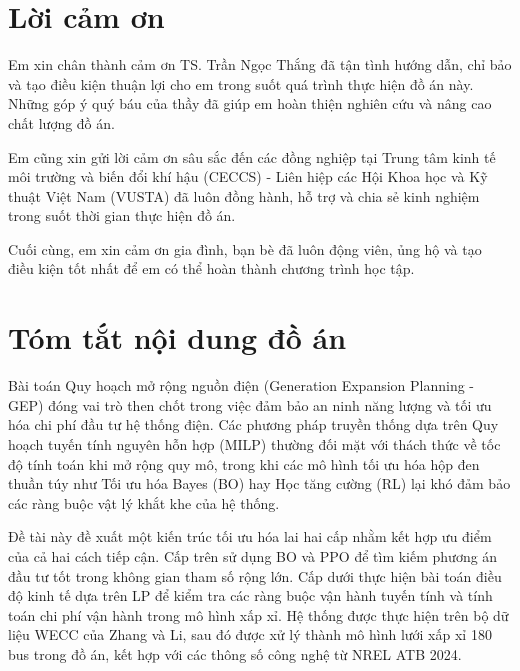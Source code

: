 \documentclass[12pt, a4paper]{report}
\begin{document}
\newpage
\chapter*{Lời cảm ơn}

\hspace*{\parindent}
Em xin chân thành cảm ơn TS. Trần Ngọc Thắng đã tận tình hướng dẫn, chỉ bảo và tạo điều kiện thuận lợi cho em trong suốt quá trình thực hiện đồ án này. Những góp ý quý báu của thầy đã giúp em hoàn thiện nghiên cứu và nâng cao chất lượng đồ án.

Em cũng xin gửi lời cảm ơn sâu sắc đến các đồng nghiệp tại Trung tâm kinh tế môi trường và biến đổi khí hậu (CECCS) - Liên hiệp các Hội Khoa học và Kỹ thuật Việt Nam (VUSTA) đã luôn đồng hành, hỗ trợ và chia sẻ kinh nghiệm trong suốt thời gian thực hiện đồ án.

Cuối cùng, em xin cảm ơn gia đình, bạn bè đã luôn động viên, ủng hộ và tạo điều kiện tốt nhất để em có thể hoàn thành chương trình học tập.

\newpage
\thispagestyle{plain}
\chapter*{Tóm tắt nội dung đồ án}

\noindent
Bài toán Quy hoạch mở rộng nguồn điện (Generation Expansion Planning - GEP) đóng vai trò then chốt trong việc đảm bảo an ninh năng lượng và tối ưu hóa chi phí đầu tư hệ thống điện. Các phương pháp truyền thống dựa trên Quy hoạch tuyến tính nguyên hỗn hợp (MILP) thường đối mặt với thách thức về tốc độ tính toán khi mở rộng quy mô, trong khi các mô hình tối ưu hóa hộp đen thuần túy như Tối ưu hóa Bayes (BO) hay Học tăng cường (RL) lại khó đảm bảo các ràng buộc vật lý khắt khe của hệ thống.

Đề tài này đề xuất một kiến trúc tối ưu hóa lai hai cấp nhằm kết hợp ưu điểm của cả hai cách tiếp cận. Cấp trên sử dụng BO và PPO để tìm kiếm phương án đầu tư tốt trong không gian tham số rộng lớn. Cấp dưới thực hiện bài toán điều độ kinh tế dựa trên LP để kiểm tra các ràng buộc vận hành tuyến tính và tính toán chi phí vận hành trong mô hình xấp xỉ. Hệ thống được thực hiện trên bộ dữ liệu WECC của Zhang và Li, sau đó được xử lý thành mô hình lưới xấp xỉ 180 bus trong đồ án, kết hợp với các thông số công nghệ từ NREL ATB 2024.
\end{document}
